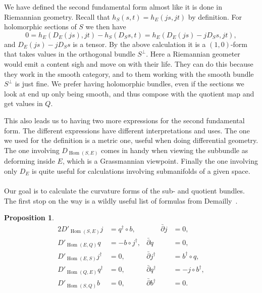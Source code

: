 \documentclass[10pt,a4paper]{article}
\newtheorem{prop}[theo]{Proposition}
\DeclareMathOperator{\Hom}{Hom}
\begin{document}
We have defined the second fundamental form almost like it is done in Riemannian geometry. Recall that $h_S(s,t) = h_E(js,jt)$ by definition. For holomorphic sections of $S$ we then have
\[
0
= h_E(D_E(js), jt) - h_S(D_Ss,t)
= h_E(D_E(js) - jD_Ss, jt),
\]
and $D_E(js) - jD_Ss$ is a tensor. By the above calculation it is a $(1,0)$-form that takes values in the orthogonal bundle $S^\perp$. Here a Riemannian geometer would emit a content sigh and move on with their life. They can do this because they work in the smooth category, and to them working with the smooth bundle $S^\perp$ is just fine. We prefer having holomorphic bundles, even if the sections we look at end up only being smooth, and thus compose with the quotient map and get values in $Q$.

This also leads us to having two more expressions for the second fundamental form. The different expressions have different interpretations and uses. The one we used for the definition is a metric one, useful when doing differential geometry. The one involving $D_{\Hom(S,E)}$ comes in handy when viewing the subbundle as deforming inside $E$, which is a Grassmannian viewpoint. Finally the one involving only $D_E$ is quite useful for calculations involving submanifolds of a given space.



\paragraph{}

Our goal is to calculate the curvature forms of the sub- and quotient bundles. The first stop on the way is a wildly useful list of formulas from Demailly~{{\cite[Theorem~14.3]{demailly-complex}}}.


\begin{prop}
\label{prop:seq-formulas}
\begin{alignat*}{2}
D'_{\Hom(S,E)}j &= q^\dagger \circ b,
&
\qquad
\bar\partial j &= 0,
\\
D'_{\Hom(E, Q)} q &= - b \circ j^\dagger,
&
\bar\partial q &= 0,
\\
D'_{\Hom(E,S)} j^\dagger &= 0,
&
\bar\partial j^\dagger &= b^\dagger \circ q,
\\
D'_{\Hom(Q,E)} q^\dagger &= 0,
&
\bar\partial q^\dagger &= - j \circ b^\dagger,
\\
D'_{\Hom(S,Q)} b &= 0,
&
\bar\partial b^\dagger &= 0.
\end{alignat*}
\end{prop}
\end{document}
